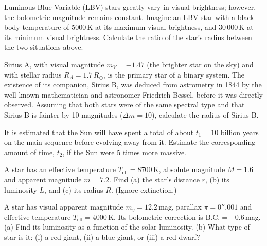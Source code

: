 Luminous Blue Variable (LBV) stars greatly vary in visual brightness; however,
the bolometric magnitude remains constant. Imagine an LBV star with a black body
temperature of $5000$\,K at its maximum visual brightness, and $30\,000$\,K at
its minimum visual brightness. Calculate the ratio of the star's radius between
the two situations above.

Sirius A, with visual magnitude $m_V = -1.47$ (the brighter star on the sky) and
with stellar radius $R_A = 1.7\,R_\odot$, is the primary star of a binary system.
The existence of its companion, Sirius B, was deduced from astrometry in 1844 by
the well known mathematician and astronomer Friedrich Bessel, before it was
directly observed. Assuming that both stars were of the same spectral type and
that Sirius B is fainter by 10 magnitudes ($\Delta m = 10$), calculate the radius
of Sirius B.

It is estimated that the Sun will have spent a total of about
$t_1 = 10$ billion years on the main sequence before evolving away from it.
Estimate the corresponding amount of time, $t_2$, if the Sun were 5 times more
massive.

A star has an effective temperature $T_{\mathrm{eff}} = 8700$\,K, absolute
magnitude $M = 1.6$ and apparent magnitude $m = 7.2$. Find (a) the star's
distance $r$, (b) its luminosity $L$, and (c) its radius $R$. (Ignore
extinction.)

A star has visual apparent magnitude $m_v = 12.2$\,mag, parallax
$\pi = 0''.001$ and effective temperature $T_{\mathrm{eff}} = 4000$\,K. Its
bolometric correction is $\mathrm{B.C.} = -0.6$\,mag.
(a) Find its luminosity as a function of the solar luminosity.
(b) What type of star is it: (i) a red giant, (ii) a blue giant, or (iii) a red
dwarf?


